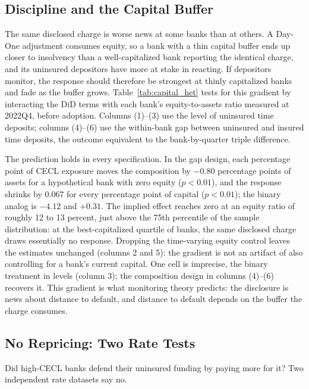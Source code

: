 \subsection{Discipline and the Capital Buffer}
\label{sec:results:capital}

The same disclosed charge is worse news at some banks than at others.
A Day-One adjustment consumes equity, so a bank with a thin capital
buffer ends up closer to insolvency than a well-capitalized bank
reporting the identical charge, and its uninsured depositors have more
at stake in reacting.  If depositors monitor, the response should
therefore be strongest at thinly capitalized banks and fade as the
buffer grows.  Table~\ref{tab:capital_het} tests for this gradient by
interacting the DiD terms with each bank's equity-to-assets ratio
measured at 2022Q4, before adoption.  Columns (1)--(3) use the level
of uninsured time deposits; columns (4)--(6) use the within-bank gap
between uninsured and insured time deposits, the outcome equivalent to
the bank-by-quarter triple difference.

The prediction holds in every specification.  In the gap design, each
percentage point of CECL exposure moves the composition by $-0.80$
percentage points of assets for a hypothetical bank with zero equity
($p<0.01$), and the response shrinks by $0.067$ for every percentage
point of capital ($p<0.01$); the binary analog is $-4.12$ and
$+0.31$.  The implied effect reaches
zero at an equity ratio of roughly 12 to 13 percent, just above the
75th percentile of the sample distribution: at the best-capitalized
quartile of banks, the same disclosed charge draws essentially no
response.  Dropping the time-varying equity control leaves the
estimates unchanged (columns 2 and 5): the gradient is not an artifact
of also controlling for a bank's current capital.  One cell is
imprecise, the binary treatment in levels (column 3); the composition
design in columns (4)--(6) recovers it.  This gradient is what monitoring theory
predicts: the disclosure is news about distance to default, and
distance to default depends on the buffer the charge consumes.

\subsection{No Repricing: Two Rate Tests}
\label{sec:results:rates}

Did high-CECL banks defend their uninsured funding by paying more for
it?  Two independent rate datasets say no.


